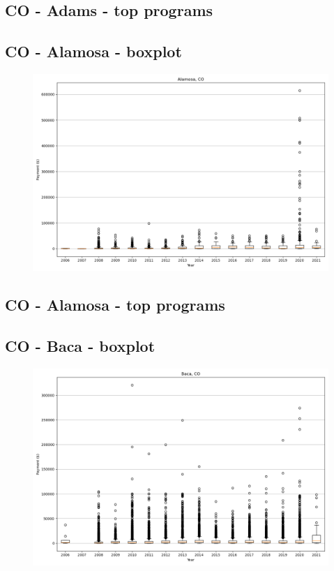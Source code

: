 \subsection*{CO - Adams - top programs}

\newpage
\subsection*{CO - Alamosa - boxplot}
\begin{figure}[h]
\centering
\includegraphics[width=7in]{../output/boxplots/counties/Alamosa-CO_boxplot.png}
\end{figure}


\subsection*{CO - Alamosa - top programs}

\newpage
\subsection*{CO - Baca - boxplot}
\begin{figure}[h]
\centering
\includegraphics[width=7in]{../output/boxplots/counties/Baca-CO_boxplot.png}
\end{figure}


